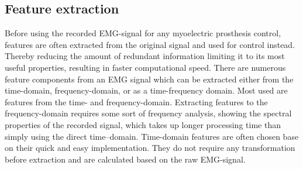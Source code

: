 
\subsection{Feature extraction}

Before using the recorded EMG-signal for any myoelectric prosthesis control, features are often extracted from the original signal and used for control instead. Thereby reducing the amount of redundant information limiting it to its most useful properties, resulting in faster computational speed. 
There are numerous feature components from an EMG signal which can be extracted either from the time-domain, frequency-domain, or as a time-frequency domain. Most used are features from the time- and frequency-domain. Extracting features to the frequency-domain requires some sort of frequency analysis, showing the spectral properties of the recorded signal, which takes up longer processing time than simply using the direct time--domain. 
Time-domain features are often chosen base on their quick and easy implementation. They do not require any transformation before extraction and are calculated based on the raw EMG-signal.\cite{Phiny2012} 
